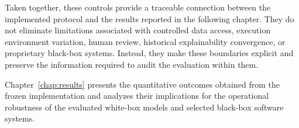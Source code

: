 Taken together, these controls provide a traceable connection between the
implemented protocol and the results reported in the following chapter. They do
not eliminate limitations associated with controlled data access, execution
environment variation, human review, historical explainability convergence,
or proprietary black-box systems. Instead, they make these boundaries explicit
and preserve the information required to audit the evaluation within them.

Chapter~\ref{chap:results} presents the quantitative outcomes obtained from the
frozen implementation and analyzes their implications for the operational
robustness of the evaluated white-box models and selected black-box software
systems.













